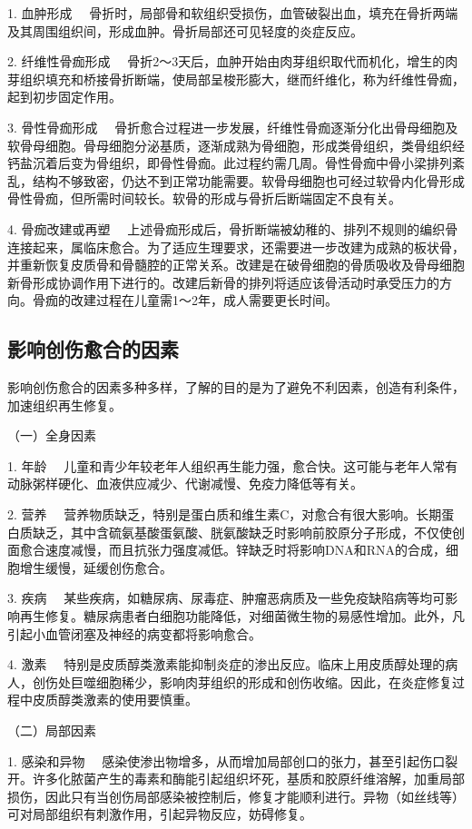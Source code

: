 {1. 血肿形成}
　骨折时，局部骨和软组织受损伤，血管破裂出血，填充在骨折两端及其周围组织间，形成血肿。骨折局部还可见轻度的炎症反应。

{2. 纤维性骨痂形成}
　骨折2～3天后，血肿开始由肉芽组织取代而机化，增生的肉芽组织填充和桥接骨折断端，使局部呈梭形膨大，继而纤维化，称为纤维性骨痂，起到初步固定作用。

{3. 骨性骨痂形成}
　骨折愈合过程进一步发展，纤维性骨痂逐渐分化出骨母细胞及软骨母细胞。骨母细胞分泌基质，逐渐成熟为骨细胞，形成类骨组织，类骨组织经钙盐沉着后变为骨组织，即骨性骨痂。此过程约需几周。骨性骨痂中骨小梁排列紊乱，结构不够致密，仍达不到正常功能需要。软骨母细胞也可经过软骨内化骨形成骨性骨痂，但所需时间较长。软骨的形成与骨折后断端固定不良有关。

{4. 骨痂改建或再塑}
　上述骨痂形成后，骨折断端被幼稚的、排列不规则的编织骨连接起来，属临床愈合。为了适应生理要求，还需要进一步改建为成熟的板状骨，并重新恢复皮质骨和骨髓腔的正常关系。改建是在破骨细胞的骨质吸收及骨母细胞新骨形成协调作用下进行的。改建后新骨的排列将适应该骨活动时承受压力的方向。骨痂的改建过程在儿童需1～2年，成人需要更长时间。

\subsection{影响创伤愈合的因素}

影响创伤愈合的因素多种多样，了解的目的是为了避免不利因素，创造有利条件，加速组织再生修复。

{（一）全身因素}

{1. 年龄}
　儿童和青少年较老年人组织再生能力强，愈合快。这可能与老年人常有动脉粥样硬化、血液供应减少、代谢减慢、免疫力降低等有关。

{2. 营养}
　营养物质缺乏，特别是蛋白质和维生素C，对愈合有很大影响。长期蛋白质缺乏，其中含硫氨基酸蛋氨酸、胱氨酸缺乏时影响前胶原分子形成，不仅使创面愈合速度减慢，而且抗张力强度减低。锌缺乏时将影响DNA和RNA的合成，细胞增生缓慢，延缓创伤愈合。

{3. 疾病}
　某些疾病，如糖尿病、尿毒症、肿瘤恶病质及一些免疫缺陷病等均可影响再生修复。糖尿病患者白细胞功能降低，对细菌微生物的易感性增加。此外，凡引起小血管闭塞及神经的病变都将影响愈合。

{4. 激素}
　特别是皮质醇类激素能抑制炎症的渗出反应。临床上用皮质醇处理的病人，创伤处巨噬细胞稀少，影响肉芽组织的形成和创伤收缩。因此，在炎症修复过程中皮质醇类激素的使用要慎重。

{（二）局部因素}

{1. 感染和异物}
　感染使渗出物增多，从而增加局部创口的张力，甚至引起伤口裂开。许多化脓菌产生的毒素和酶能引起组织坏死，基质和胶原纤维溶解，加重局部损伤，因此只有当创伤局部感染被控制后，修复才能顺利进行。异物（如丝线等）可对局部组织有刺激作用，引起异物反应，妨碍修复。

